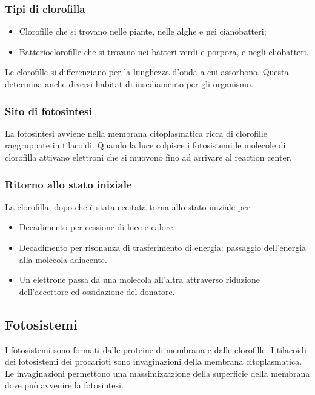 		\subsubsection{Tipi di clorofilla}
		\begin{multicols}{2}
			\begin{itemize}
 	   			\item Clorofille che si trovano nelle piante, nelle alghe e nei cianobatteri; 
    				\item Batterioclorofille che si trovano nei batteri verdi e porpora, e negli eliobatteri.
			\end{itemize}
		\end{multicols}
		Le clorofille si differenziano per la lunghezza d'onda a cui assorbono.
		Questa determina anche diversi habitat di insediamento per gli organismo.

		\subsubsection{Sito di fotosintesi}
		La fotosintesi avviene nella membrana citoplasmatica ricca di clorofille raggruppate in tilacoidi.
		Quando la luce colpisce i fotosistemi le molecole di clorofilla attivano elettroni che si muovono fino ad arrivare al reaction center.

		\subsubsection{Ritorno allo stato iniziale}
		La clorofilla, dopo che \`e stata eccitata torna allo stato iniziale per:
		\begin{multicols}{2}
			\begin{itemize}
				\item Decadimento per cessione di luce e calore.
				\item Decadimento per risonanza di trasferimento di energia: passaggio dell'energia alla molecola adiacente.
				\item Un elettrone passa da una molecola all'altra attraverso riduzione dell'accettore ed ossidazione del donatore.
			\end{itemize}
		\end{multicols}

	\subsection{Fotosistemi}
	I fotosistemi sono formati dalle proteine di membrana e dalle clorofille.
	I tilacoidi dei fotosistemi dei procarioti sono invaginazioni della membrana citoplasmatica.
	Le invaginazioni permettono una massimizzazione della superficie della membrana dove pu\`o avvenire la fotosintesi.

